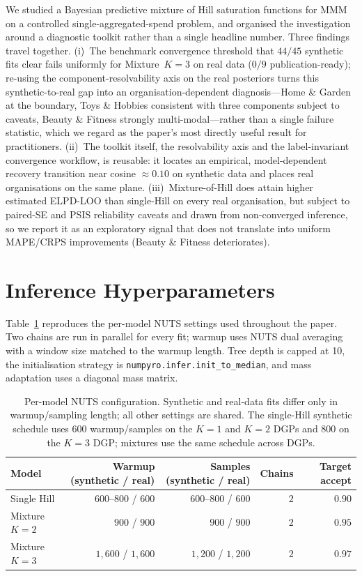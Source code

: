 \documentclass[11pt]{article}
\begin{document}
We studied a Bayesian predictive mixture of Hill saturation functions for MMM on a controlled single-aggregated-spend problem, and organised the investigation around a diagnostic toolkit rather than a single headline number. Three findings travel together. (i)~The benchmark convergence threshold that $44/45$ synthetic fits clear fails uniformly for Mixture~$K=3$ on real data ($0/9$ publication-ready); re-using the component-resolvability axis on the real posteriors turns this synthetic-to-real gap into an organisation-dependent diagnosis---Home \& Garden at the boundary, Toys \& Hobbies consistent with three components subject to caveats, Beauty \& Fitness strongly multi-modal---rather than a single failure statistic, which we regard as the paper's most directly useful result for practitioners. (ii)~The toolkit itself, the resolvability axis and the label-invariant convergence workflow, is reusable: it locates an empirical, model-dependent recovery transition near cosine $\approx 0.10$ on synthetic data and places real organisations on the same plane. (iii)~Mixture-of-Hill does attain higher estimated ELPD-LOO than single-Hill on every real organisation, but subject to paired-SE and PSIS reliability caveats and drawn from non-converged inference, so we report it as an exploratory signal that does not translate into uniform MAPE/CRPS improvements (Beauty \& Fitness deteriorates).




\appendix

\section{Inference Hyperparameters}
\label{app:hyperparams}

Table~\ref{tab:hyperparams} reproduces the per-model NUTS settings used throughout the paper. Two chains are run in parallel for every fit; warmup uses NUTS dual averaging with a window size matched to the warmup length. Tree depth is capped at 10, the initialisation strategy is \texttt{numpyro.infer.init\_to\_median}, and mass adaptation uses a diagonal mass matrix.

\begin{table}[ht]
\centering
\caption{Per-model NUTS configuration. Synthetic and real-data fits differ only in warmup/sampling length; all other settings are shared. The single-Hill synthetic schedule uses $600$ warmup/samples on the $K=1$ and $K=2$ DGPs and $800$ on the $K=3$ DGP; mixtures use the same schedule across DGPs.}
\label{tab:hyperparams}
\begin{tabular}{lrrrr}
\toprule
Model & Warmup (synthetic / real) & Samples (synthetic / real) & Chains & Target accept \\
\midrule
Single Hill    & $600$--$800$ / $600$ & $600$--$800$ / $600$ & $2$ & $0.90$ \\
Mixture $K=2$ & $900$ / $900$        & $900$ / $900$        & $2$ & $0.95$ \\
Mixture $K=3$ & $1{,}600$ / $1{,}600$ & $1{,}200$ / $1{,}200$ & $2$ & $0.97$ \\
\bottomrule
\end{tabular}
\end{table}
\end{document}
